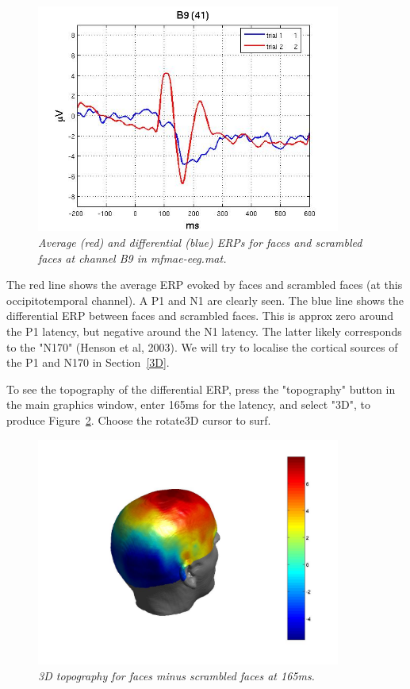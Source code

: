 \begin{figure}
\begin{center}
\includegraphics[width=100mm]{multimodal/figures/figure_32_4}
\caption{\em  Average (red) and differential (blue) ERPs for faces and scrambled faces at channel B9 in mfmae-eeg.mat. \label{fig_32_4}}
\end{center}
\end{figure}

The red line shows the average ERP evoked by faces and scrambled faces (at this occipitotemporal channel). A P1 and N1 are clearly seen. The blue line shows the differential ERP between faces and scrambled faces. This is approx zero around the P1 latency, but negative around the N1 latency. The latter likely corresponds to the "N170" (Henson et al, 2003). We will try to localise the cortical sources of the P1 and N170 in Section~\ref{3D}.

To see the topography of the differential ERP, press the "topography" button in the main graphics window, enter 165ms for the latency, and select "3D", to produce Figure~\ref{fig_32_5}. Choose the rotate3D cursor to surf.

\begin{figure}
\begin{center}
\includegraphics[width=100mm]{multimodal/figures/figure_32_5}
\caption{\em 3D topography for faces minus scrambled faces at 165ms. \label{fig_32_5}}
\end{center}
\end{figure}


